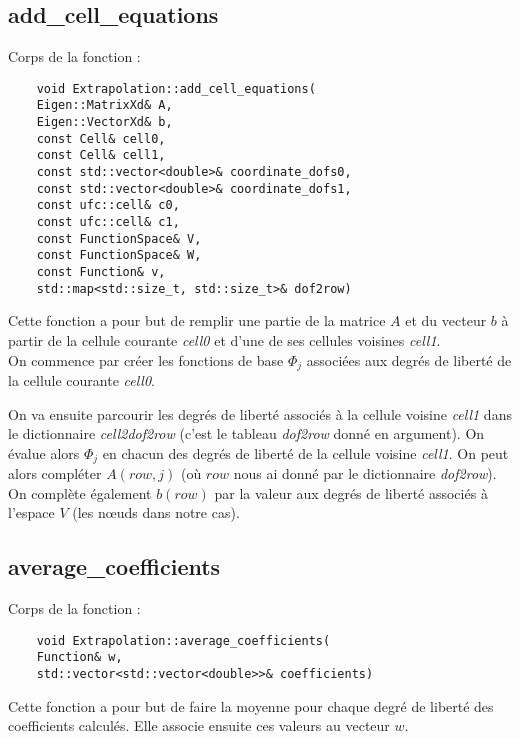 \subsection{add\_cell\_equations}
\label{add_cell_equations}

Corps de la fonction :

\begin{lstlisting}
	void Extrapolation::add_cell_equations(
	Eigen::MatrixXd& A,
	Eigen::VectorXd& b,
	const Cell& cell0,
	const Cell& cell1,
	const std::vector<double>& coordinate_dofs0,
	const std::vector<double>& coordinate_dofs1,
	const ufc::cell& c0,
	const ufc::cell& c1,
	const FunctionSpace& V,
	const FunctionSpace& W,
	const Function& v,
	std::map<std::size_t, std::size_t>& dof2row)
\end{lstlisting}

Cette fonction a pour but de remplir une partie de la matrice $A$ et du vecteur $b$ à partir de la cellule courante \textit{cell0} et d'une de ses cellules voisines \textit{cell1}. \\

On commence par créer les fonctions de base $\Phi_j$ associées aux degrés de liberté de la cellule courante \textit{cell0}.

On va ensuite parcourir les degrés de liberté associés à la cellule voisine \textit{cell1} dans le dictionnaire \textit{cell2dof2row} (c'est le tableau \textit{dof2row} donné en argument). On évalue alors $\Phi_j$ en chacun des degrés de liberté de la cellule voisine \textit{cell1}. On peut alors compléter $A(row,j)$ (où $row$ nous ai donné par le dictionnaire \textit{dof2row}). On complète également $b(row)$ par la valeur aux degrés de liberté associés à l'espace $V$ (les nœuds dans notre cas). 

\subsection{average\_coefficients}
\label{average_coefficients}

Corps de la fonction :

\begin{lstlisting}
	void Extrapolation::average_coefficients(
	Function& w,
	std::vector<std::vector<double>>& coefficients)	
\end{lstlisting}

Cette fonction a pour but de faire la moyenne pour chaque degré de liberté des coefficients calculés. Elle associe ensuite ces valeurs au vecteur $w$.

